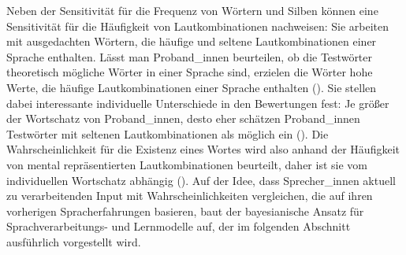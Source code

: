 Neben der Sensitivität für die Frequenz von Wörtern und Silben können \textcite{Frisch.2001} eine Sensitivität für die Häufigkeit von Lautkombinationen nachweisen: Sie arbeiten mit ausgedachten Wörtern, die häufige und seltene Lautkombinationen einer Sprache enthalten. Lässt man Proband\_innen beurteilen, ob die Testwörter theoretisch mögliche Wörter in einer Sprache sind, erzielen die Wörter hohe Werte, die häufige Lautkombinationen einer Sprache enthalten (\cite[162--163]{Frisch.2001}). Sie stellen dabei interessante individuelle Unterschiede in den Bewertungen fest: Je größer der Wortschatz von Proband\_innen, desto eher schätzen Proband\_innen Testwörter mit seltenen Lautkombinationen als möglich ein (\cite[166]{Frisch.2001}). Die Wahrscheinlichkeit für die Existenz eines Wortes wird also anhand der Häufigkeit von mental repräsentierten Lautkombinationen beurteilt, daher ist sie vom individuellen Wortschatz abhängig (\cite[175]{Frisch.2001}). Auf der Idee, dass Sprecher\_innen aktuell zu verarbeitenden Input mit Wahrscheinlichkeiten vergleichen, die auf ihren vorherigen Spracherfahrungen basieren, baut der bayesianische Ansatz für Sprachverarbeitungs- und Lernmodelle auf, der im folgenden Abschnitt ausführlich vorgestellt wird.

